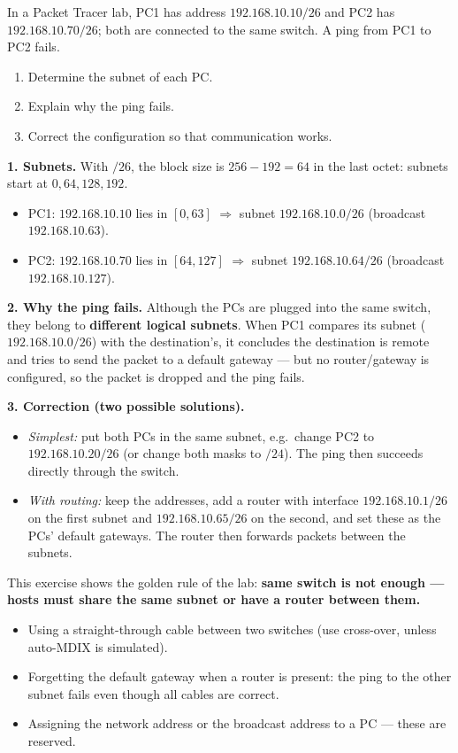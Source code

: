 \documentclass[11pt]{article}
\newcommand{\cle}[1]{{\popxbold\color{popdark}#1}}
\begin{document}
\begin{exoresolu}
In a Packet Tracer lab, PC1 has address $192.168.10.10/26$ and PC2 has $192.168.10.70/26$; both are connected to the same switch. A ping from PC1 to PC2 fails.
\begin{enumerate}
\item Determine the subnet of each PC.
\item Explain why the ping fails.
\item Correct the configuration so that communication works.
\end{enumerate}
\tcblower
\textbf{1. Subnets.} With $/26$, the block size is $256 - 192 = 64$ in the last octet: subnets start at $0, 64, 128, 192$.
\begin{itemize}
\item PC1: $192.168.10.10$ lies in $[0, 63]$ $\Rightarrow$ subnet $192.168.10.0/26$ (broadcast $192.168.10.63$).
\item PC2: $192.168.10.70$ lies in $[64, 127]$ $\Rightarrow$ subnet $192.168.10.64/26$ (broadcast $192.168.10.127$).
\end{itemize}

\textbf{2. Why the ping fails.} Although the PCs are plugged into the same switch, they belong to \textbf{different logical subnets}. When PC1 compares its subnet ($192.168.10.0/26$) with the destination's, it concludes the destination is remote and tries to send the packet to a \cle{default gateway} --- but no router/gateway is configured, so the packet is dropped and the ping fails.

\textbf{3. Correction (two possible solutions).}
\begin{itemize}
\item \emph{Simplest:} put both PCs in the same subnet, e.g.\ change PC2 to $192.168.10.20/26$ (or change both masks to $/24$). The ping then succeeds directly through the switch.
\item \emph{With routing:} keep the addresses, add a router with interface $192.168.10.1/26$ on the first subnet and $192.168.10.65/26$ on the second, and set these as the PCs' default gateways. The router then forwards packets between the subnets.
\end{itemize}
This exercise shows the golden rule of the lab: \textbf{same switch is not enough --- hosts must share the same subnet or have a router between them.}
\end{exoresolu}

\begin{attention}
\begin{itemize}
\item Using a straight-through cable between two switches (use cross-over, unless auto-MDIX is simulated).
\item Forgetting the default gateway when a router is present: the ping to the other subnet fails even though all cables are correct.
\item Assigning the network address or the broadcast address to a PC --- these are reserved.
\end{itemize}
\end{attention}
\end{document}
